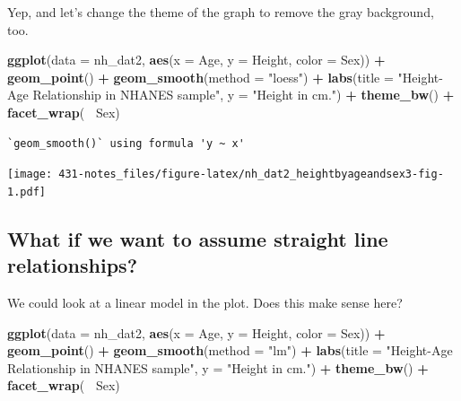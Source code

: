 \documentclass[
]{book}
\newenvironment{Shaded}{\begin{snugshade}}{\end{snugshade}}
\newcommand{\DataTypeTok}[1]{\textcolor[rgb]{0.13,0.29,0.53}{#1}}
\newcommand{\KeywordTok}[1]{\textcolor[rgb]{0.13,0.29,0.53}{\textbf{#1}}}
\newcommand{\NormalTok}[1]{#1}
\newcommand{\OperatorTok}[1]{\textcolor[rgb]{0.81,0.36,0.00}{\textbf{#1}}}
\newcommand{\StringTok}[1]{\textcolor[rgb]{0.31,0.60,0.02}{#1}}
\begin{document}
Yep, and let's change the theme of the graph to remove the gray background, too.

\begin{Shaded}
\begin{Highlighting}[]
\KeywordTok{ggplot}\NormalTok{(}\DataTypeTok{data =}\NormalTok{ nh_dat2, }\KeywordTok{aes}\NormalTok{(}\DataTypeTok{x =}\NormalTok{ Age, }\DataTypeTok{y =}\NormalTok{ Height, }\DataTypeTok{color =}\NormalTok{ Sex)) }\OperatorTok{+}
\StringTok{    }\KeywordTok{geom_point}\NormalTok{() }\OperatorTok{+}\StringTok{ }
\StringTok{    }\KeywordTok{geom_smooth}\NormalTok{(}\DataTypeTok{method =} \StringTok{"loess"}\NormalTok{) }\OperatorTok{+}
\StringTok{    }\KeywordTok{labs}\NormalTok{(}\DataTypeTok{title =} \StringTok{"Height-Age Relationship in NHANES sample"}\NormalTok{, }
         \DataTypeTok{y =} \StringTok{"Height in cm."}\NormalTok{) }\OperatorTok{+}
\StringTok{    }\KeywordTok{theme_bw}\NormalTok{() }\OperatorTok{+}
\StringTok{    }\KeywordTok{facet_wrap}\NormalTok{(}\OperatorTok{~}\StringTok{ }\NormalTok{Sex)}
\end{Highlighting}
\end{Shaded}

\begin{verbatim}
`geom_smooth()` using formula 'y ~ x'
\end{verbatim}

\texttt{[image: 431-notes\_files/figure-latex/nh\_dat2\_heightbyageandsex3-fig-1.pdf]}

\hypertarget{what-if-we-want-to-assume-straight-line-relationships}{%
\subsection{What if we want to assume straight line relationships?}\label{what-if-we-want-to-assume-straight-line-relationships}}

We could look at a linear model in the plot. Does this make sense here?

\begin{Shaded}
\begin{Highlighting}[]
\KeywordTok{ggplot}\NormalTok{(}\DataTypeTok{data =}\NormalTok{ nh_dat2, }\KeywordTok{aes}\NormalTok{(}\DataTypeTok{x =}\NormalTok{ Age, }\DataTypeTok{y =}\NormalTok{ Height, }\DataTypeTok{color =}\NormalTok{ Sex)) }\OperatorTok{+}
\StringTok{    }\KeywordTok{geom_point}\NormalTok{() }\OperatorTok{+}\StringTok{ }
\StringTok{    }\KeywordTok{geom_smooth}\NormalTok{(}\DataTypeTok{method =} \StringTok{"lm"}\NormalTok{) }\OperatorTok{+}
\StringTok{    }\KeywordTok{labs}\NormalTok{(}\DataTypeTok{title =} \StringTok{"Height-Age Relationship in NHANES sample"}\NormalTok{, }
         \DataTypeTok{y =} \StringTok{"Height in cm."}\NormalTok{) }\OperatorTok{+}
\StringTok{    }\KeywordTok{theme_bw}\NormalTok{() }\OperatorTok{+}
\StringTok{    }\KeywordTok{facet_wrap}\NormalTok{(}\OperatorTok{~}\StringTok{ }\NormalTok{Sex)}
\end{Highlighting}
\end{Shaded}
\end{document}
